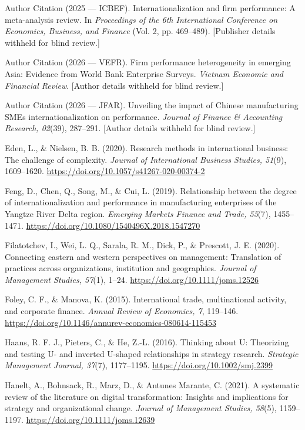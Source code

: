 \documentclass[12pt,a4paper]{article}
\begin{document}
Author Citation (2025 --- ICBEF). Internationalization and firm
performance: A meta-analysis review. In \emph{Proceedings of the 6th
International Conference on Economics, Business, and Finance} (Vol. 2,
pp. 469--489). {[}Publisher details withheld for blind review.{]}

Author Citation (2026 --- VEFR). Firm performance heterogeneity in
emerging Asia: Evidence from World Bank Enterprise Surveys.
\emph{Vietnam Economic and Financial Review}. {[}Author details withheld
for blind review.{]}

Author Citation (2026 --- JFAR). Unveiling the impact of Chinese
manufacturing SMEs\textquotesingle{} internationalization on
performance. \emph{Journal of Finance \& Accounting Research, 02}(39),
287--291. {[}Author details withheld for blind review.{]}

Eden, L., \& Nielsen, B. B. (2020). Research methods in international
business: The challenge of complexity. \emph{Journal of International
Business Studies, 51}(9), 1609--1620.
\url{https://doi.org/10.1057/s41267-020-00374-2}

Feng, D., Chen, Q., Song, M., \& Cui, L. (2019). Relationship between
the degree of internationalization and performance in manufacturing
enterprises of the Yangtze River Delta region. \emph{Emerging Markets
Finance and Trade, 55}(7), 1455--1471.
\url{https://doi.org/10.1080/1540496X.2018.1547270}

Filatotchev, I., Wei, L. Q., Sarala, R. M., Dick, P., \& Prescott, J. E.
(2020). Connecting eastern and western perspectives on management:
Translation of practices across organizations, institution and
geographies. \emph{Journal of Management Studies, 57}(1), 1--24.
\url{https://doi.org/10.1111/joms.12526}

Foley, C. F., \& Manova, K. (2015). International trade, multinational
activity, and corporate finance. \emph{Annual Review of Economics, 7},
119--146. \url{https://doi.org/10.1146/annurev-economics-080614-115453}

Haans, R. F. J., Pieters, C., \& He, Z.-L. (2016). Thinking about U:
Theorizing and testing U- and inverted U-shaped relationships in
strategy research. \emph{Strategic Management Journal, 37}(7),
1177--1195. \url{https://doi.org/10.1002/smj.2399}

Hanelt, A., Bohnsack, R., Marz, D., \& Antunes Marante, C. (2021). A
systematic review of the literature on digital transformation: Insights
and implications for strategy and organizational change. \emph{Journal
of Management Studies, 58}(5), 1159--1197.
\url{https://doi.org/10.1111/joms.12639}
\end{document}
